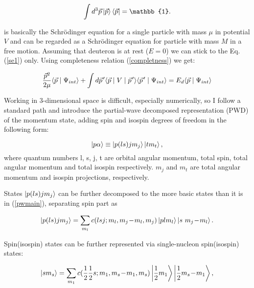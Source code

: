     \begin{equation}
        \int d^3\vec{p} \ket{\vec{p}} \bra{\vec{p}}   = \mathbb{1}.
        \label{completness}
    \end{equation}

     is basically the Schr\"{o}dinger equation for a single particle with mass $\mu$
    in potential $V$ 
    and  can be regarded as a Schr\"{o}dinger equation for particle with mass $M$ in 
    a free motion. Assuming that deuteron is at rest ($E = 0$) we can stick 
    to the Eq.(\ref{se1}) only. Using completeness relation (\ref{completness}) we get:

    \begin{equation}
        \frac{\vec{p}^2}{2\mu} \langle \vec{p} \mid \Psi_{int} \rangle +
        \int d \pvec{p} \langle \vec{p} \mid V \mid \pvec{p} \rangle
        \langle \pvec{p} \mid \Psi_{int} \rangle = 
        E_d \langle \vec{p} \mid \Psi_{int} \rangle
        \label{shrod_old}
    \end{equation}

    Working in 3-dimensional space  is difficult, especially numerically,
    so I follow a standard path and introduce the partial-wave decomposed representation (PWD) 
    of the momentum state, adding spin and isospin degrees of freedom in the following form:

    \begin{equation}
        \ket{p \alpha} \equiv \ket{p (ls) j m_j}  \ket{t m_t},
        \label{pwmain}
    \end{equation}
    where quantum numbers l, s, j, t are orbital angular momentum, total spin,
    total angular momentum and total isospin respectively. $m_j$ and $m_t$ are 
    total angular momentum and isospin projections, respectively.


    States $\ket{p (ls) j m_j}$ can be further decomposed to 
    the more basic states than it is in (\ref{pwmain}), separating spin part as 
    
    \begin{equation}
        \ket{p (ls) j m_j} = \sum_{m_l} c(lsj;m_l, m_j\!-\!m_l, m_j) \ket{p l m_l}
        \ket{s~m_j\!-\!m_l}.
        \label{full_decomp}
    \end{equation}

    Spin(isospin) states can be further represented via single-nucleon spin(isospin) states:

    \begin{equation}
        \ket{s m_s} = \sum_{m_1} c(\frac{1}{2}\frac{1}{2}s;m_1, m_s\!-\!m_1, m_s)
        \ket{\frac{1}{2} m_1}
        \ket{\frac{1}{2} m_s\!-\!m_1},
        \label{spin_decomp}
    \end{equation}

